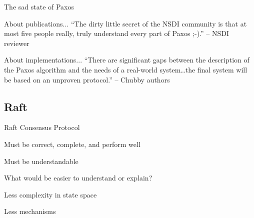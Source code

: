 \begin{frame}{The sad state of Paxos}

\begin{block}{About publications...}	
“The dirty little secret of the NSDI community is that at most five people really, truly understand every part of Paxos ;-).”  – NSDI reviewer
\end{block}

\medskip
\begin{block}{About implementations...}	
“There are significant gaps between the description of the Paxos algorithm and the needs of a real-world system…the final system will be based on an unproven protocol.”  – Chubby authors

\end{block}

\end{frame}

\subsection{Raft}


\begin{frame}{Raft Consensus Protocol}
	
\BI
\item Must be correct, complete, and perform well
\item Must be \alert{understandable}
\EI

\bigskip
{}
\BI
\item What would be easier to understand or explain?
\item Less complexity in state space
\item Less mechanisms
\EI

\bigskip
{}
\BI
\item {\small {}}
\EI
	
\end{frame}

